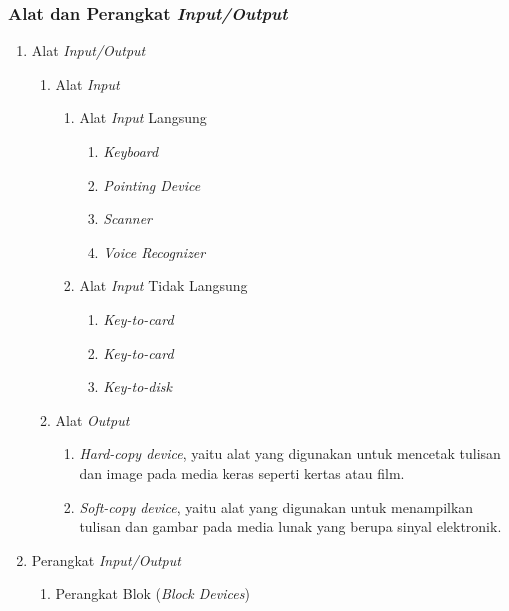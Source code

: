 \documentclass[12pt]{article}
\begin{document}
\subsubsection{Alat dan Perangkat \textit{Input/Output}}
\begin{enumerate}
    \item Alat \textit{Input/Output}
    \begin{enumerate}
        \item Alat \textit{Input}
        \begin{enumerate}
            \item Alat \textit{Input} Langsung
            \begin{enumerate}
                \item \textit{Keyboard}
                \item \textit{Pointing Device}
                \item \textit{Scanner}
                \item \textit{Voice Recognizer}
            \end{enumerate}
            \item Alat \textit{Input} Tidak Langsung
            \begin{enumerate}
                \item \textit{Key-to-card}
                \item \textit{Key-to-card}
                \item \textit{Key-to-disk}
            \end{enumerate}
        \end{enumerate}
        \item Alat \textit{Output}
        \begin{enumerate}
            \item \textit{Hard-copy device}, yaitu alat yang digunakan untuk mencetak tulisan dan image pada media keras seperti kertas atau film.
            \item \textit{Soft-copy device}, yaitu alat yang digunakan untuk menampilkan tulisan dan gambar pada media lunak yang berupa sinyal elektronik.
        \end{enumerate}
    \end{enumerate}
    \item Perangkat \textit{Input/Output}
    \begin{enumerate}
        \item Perangkat Blok (\textit{Block Devices})
        \begin{enumerate}

\end{enumerate}
\end{enumerate}
\end{enumerate}
\end{document}
